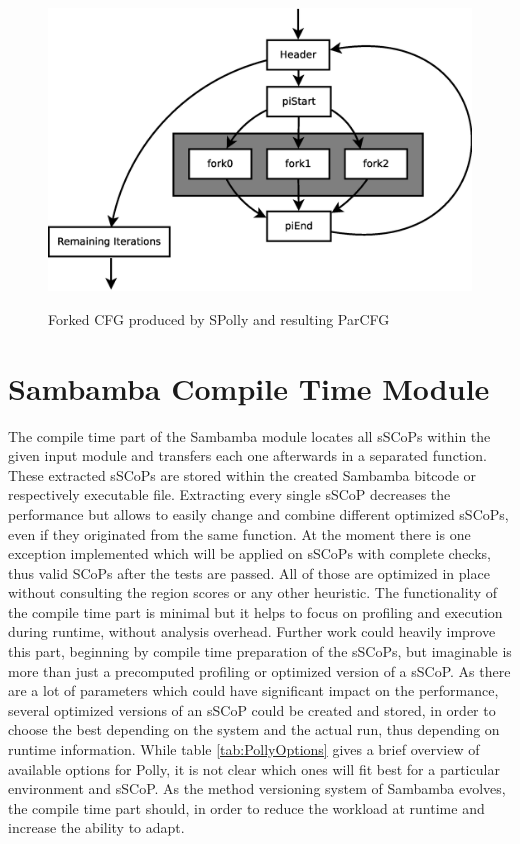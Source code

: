 \begin{figure}[htbp]
{\begin{minipage}[c][8cm]{0.50\textwidth}
    \includegraphics[width=\textwidth]{Figures/ForkJoinParCFG.eps}
    \label{fig:ForkJoinParCFG}
    \end{minipage}
  }
  \caption{Forked CFG produced by SPolly and resulting ParCFG}
  \label{fig:CreateParCFG}  
\end{figure}
\resetlst

\section{Sambamba Compile Time Module}
The compile time part of the Sambamba module locates all sSCoPs
within the given input module and transfers each one afterwards in a separated 
function. These extracted sSCoPs are stored within the created Sambamba 
bitcode or respectively executable file. Extracting every single sSCoP 
decreases the performance but allows to easily change and combine different 
optimized sSCoPs, even if they originated from the same function.   
At the moment there is one exception implemented which will be applied on sSCoPs
with complete checks, thus valid SCoPs after the tests are passed. All of those
are optimized in place without consulting the region scores or any other heuristic.
The functionality of the compile time part is minimal but it helps to focus 
on profiling and execution during runtime, without analysis overhead. 
Further work could heavily improve this part, beginning by compile time 
preparation of the sSCoPs, but imaginable is more than just a precomputed
profiling or optimized version of a sSCoP.
As there are a lot of parameters which could have significant impact 
on the performance, several optimized versions of an sSCoP could be created
and stored, in order to choose the best depending on the system and the actual
run, thus depending on runtime information.
While table \ref{tab:PollyOptions} gives a brief
overview of available options for Polly, it is not clear which ones will
fit best for a particular environment and sSCoP. 
As the method versioning system of Sambamba evolves, the compile time part 
should, in order to reduce the workload at runtime and increase the ability to
adapt. 

